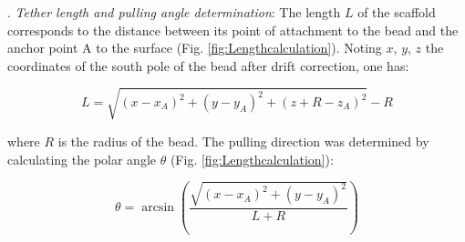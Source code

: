 \documentclass{biophys-new}
\begin{document}
. \textit{ Tether length and pulling angle determination}: The length $L$ of the scaffold corresponds to the distance between its point of attachment to the bead and the anchor point A to the surface (Fig. \ref{fig:Lengthcalculation}). Noting $x$, $y$, $z$ the coordinates of the south pole of the bead after drift correction, one has:

\begin{equation}
\label{eq:Length}
L = \sqrt{(x - x_A)^2+(y-y_A)^2+(z+R-z_A)^2}-R
\end{equation}


where $R$ is the radius of the bead. The pulling direction was determined by calculating the polar angle $\theta$ (Fig. \ref{fig:Lengthcalculation}):

\begin{equation}
\label{eq:AngleTheta}
\theta = \arcsin  \left( \dfrac{ \sqrt{(x - x_A)^2 + (y-y_A)^2 }} { L + R } \right)
\end{equation}
\end{document}
